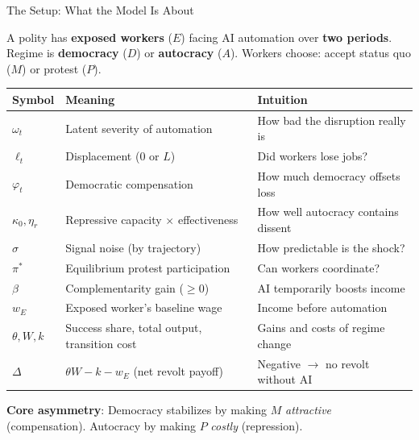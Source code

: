 \documentclass[
  ignorenonframetext,
  aspectratio=169]{beamer}
\begin{document}
\begin{frame}{The Setup: What the Model Is About}
\protect{}\label{the-setup-what-the-model-is-about}
\small

A polity has \textbf{exposed workers} (\(E\)) facing AI automation over
\textbf{two periods}. Regime is \textbf{democracy} (\(D\)) or
\textbf{autocracy} (\(A\)). Workers choose: accept status quo (\(M\)) or
protest (\(P\)).

\vspace{0.1cm}

\renewcommand{\arraystretch}{1.1}
\begin{center}
\footnotesize
\begin{tabular}{p{1.3cm} p{4.8cm} p{5cm}}
\toprule
\textbf{Symbol} & \textbf{Meaning} & \textbf{Intuition} \\
\midrule
$\omega_t$ & Latent severity of automation & How bad the disruption really is \\
$\ell_t$ & Displacement ($0$ or $L$) & Did workers lose jobs? \\
$\varphi_t$ & Democratic compensation & How much democracy offsets loss \\
$\kappa_0, \eta_r$ & Repressive capacity $\times$ effectiveness & How well autocracy contains dissent \\
$\sigma$ & Signal noise (by trajectory) & How predictable is the shock? \\
$\pi^*$ & Equilibrium protest participation & Can workers coordinate? \\
$\beta$ & Complementarity gain ($\geq 0$) & AI temporarily boosts income \\
$w_E$ & Exposed worker's baseline wage & Income before automation \\
$\theta, W, k$ & Success share, total output, transition cost & Gains and costs of regime change \\
$\Delta$ & $\theta W \!-\! k \!-\! w_E$ (net revolt payoff) & Negative $\to$ no revolt without AI \\
\bottomrule
\end{tabular}
\end{center}

\vspace{0.05cm}

\textbf{Core asymmetry}: Democracy stabilizes by making \(M\)
\emph{attractive} (compensation). Autocracy by making \(P\)
\emph{costly} (repression).
\end{frame}
\end{document}
